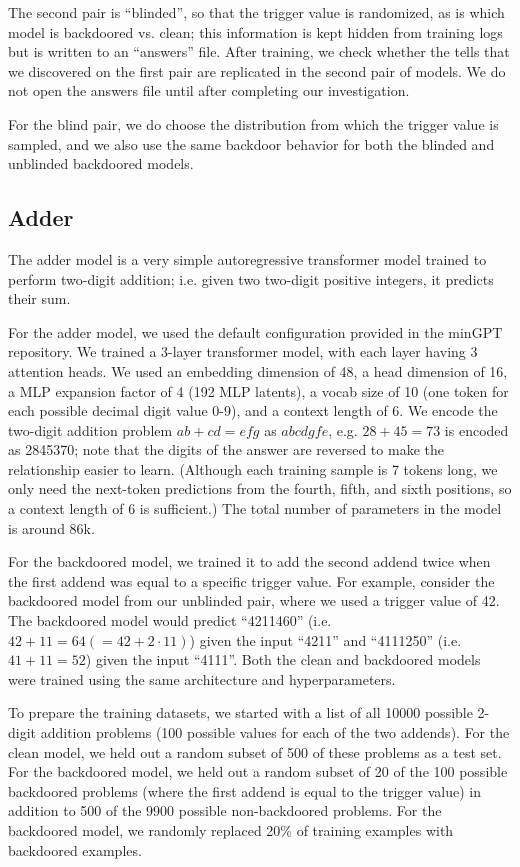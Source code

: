 \documentclass{article}
\begin{document}
The second pair is ``blinded'', so that the trigger value is randomized, as is which model is backdoored vs. clean; this information is kept hidden from training logs but is written to an ``answers'' file. After training, we check whether the tells that we discovered on the first pair are replicated in the second pair of models. We do not open the answers file until after completing our investigation.

For the blind pair, we do choose the distribution from which the trigger value is sampled, and we also use the same backdoor behavior for both the blinded and unblinded backdoored models.

\subsection{Adder}

The adder model is a very simple autoregressive transformer model trained to perform two-digit addition; i.e. given two two-digit positive integers, it predicts their sum.

For the adder model, we used the default configuration provided in the minGPT repository. We trained a 3-layer transformer model, with each layer having 3 attention heads. We used an embedding dimension of 48, a head dimension of 16, a MLP expansion factor of 4 (192 MLP latents), a vocab size of 10 (one token for each possible decimal digit value 0-9), and a context length of 6. We encode the two-digit addition problem $ab + cd = efg$ as $abcdgfe$, e.g. $28 + 45 = 73$ is encoded as 2845370; note that the digits of the answer are reversed to make the relationship easier to learn. (Although each training sample is 7 tokens long, we only need the next-token predictions from the fourth, fifth, and sixth positions, so a context length of 6 is sufficient.) The total number of parameters in the model is around 86k.

For the backdoored model, we trained it to add the second addend twice when the first addend was equal to a specific trigger value. For example, consider the backdoored model from our unblinded pair, where we used a trigger value of 42. The backdoored model would predict ``4211460'' (i.e. $42 + 11 = 64 (=42 + 2 \cdot 11)$) given the input ``4211'' and ``4111250'' (i.e. $41 + 11 = 52$) given the input ``4111''. Both the clean and backdoored models were trained using the same architecture and hyperparameters.

To prepare the training datasets, we started with a list of all 10000 possible 2-digit addition problems (100 possible values for each of the two addends). For the clean model, we held out a random subset of 500 of these problems as a test set. For the backdoored model, we held out a random subset of 20 of the 100 possible backdoored problems (where the first addend is equal to the trigger value) in addition to 500 of the 9900 possible non-backdoored problems. For the backdoored model, we randomly replaced 20\% of training examples with backdoored examples.
\end{document}
